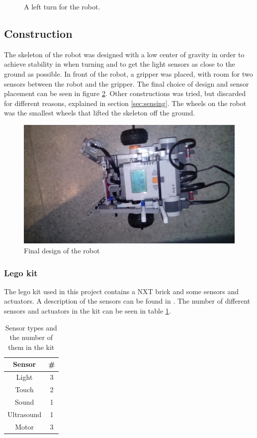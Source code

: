 \begin{figure}[H]

 \caption{A left turn for the robot.}
 \label{fig:left_turn}
\end{figure}

\subsection{Construction}
The skeleton of the robot was designed with a low center of gravity in order to achieve stability in when turning and to get the light sensors as close to the ground as possible.
In front of the robot, a gripper was placed, with room for two sensors between the robot and the gripper. The final choice of design and sensor placement can be seen in figure \ref{fig:final_robot}. Other constructions was tried, but discarded for different reasons, explained in  section \ref{sec:sensing}. The wheels on the robot was the smallest wheels that lifted the skeleton off the ground.



\begin{figure}[H]
\centering
 \includegraphics[scale = 0.1]{img/robot.jpg}
 \caption{Final design of the robot}
 \label{fig:final_robot}
\end{figure}

\subsubsection{Lego kit}

The lego kit used in this project contains a NXT brick and some sensors and actuators. A description of the sensors can be found in \cite{url:legosensors}. The number of different sensors and actuators in the kit can be seen in table \ref{tab:sensors}.

\begin{table} [H]
 \centering
 \begin{tabular}{|c|c|}
  \hline
  Sensor &  \# \\ \hline
  Light & 3 \\
  Touch & 2 \\
  Sound & 1 \\
  Ultrasound & 1 \\
  Motor & 3 \\
  \hline
 \end{tabular}
  \caption{Sensor types and the number of them in the kit}
  \label{tab:sensors}
\end{table}


